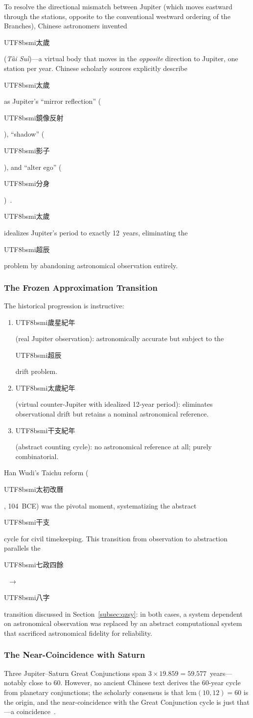 \documentclass[10pt,a4paper]{article}
\newcommand{\zh}[1]{\begin{CJK}{UTF8}{bsmi}#1\end{CJK}}
\begin{document}
To resolve the directional mismatch between Jupiter (which moves
eastward through the stations, opposite to the conventional westward
ordering of the Branches), Chinese astronomers invented \zh{太歲}
(\textit{T\`{a}i Su\`{i}})---a virtual body that moves in the
\emph{opposite} direction to Jupiter, one station per year. Chinese
scholarly sources explicitly describe \zh{太歲} as Jupiter's ``mirror
reflection'' (\zh{鏡像反射}), ``shadow'' (\zh{影子}), and ``alter ego''
(\zh{分身})~\cite{taisui_origin}. \zh{太歲} idealizes Jupiter's period
to exactly 12~years, eliminating the \zh{超辰} problem by abandoning
astronomical observation entirely.

\subsubsection{The Frozen Approximation Transition}

The historical progression is instructive:

\begin{enumerate}[nosep]
  \item \zh{歲星紀年} (real Jupiter observation): astronomically
    accurate but subject to the \zh{超辰} drift problem.
  \item \zh{太歲紀年} (virtual counter-Jupiter with idealized 12-year
    period): eliminates observational drift but retains a nominal
    astronomical reference.
  \item \zh{干支紀年} (abstract counting cycle): no astronomical
    reference at all; purely combinatorial.
\end{enumerate}

\noindent
Han Wudi's Taichu reform (\zh{太初改曆}, 104~BCE) was the pivotal
moment, systematizing the abstract \zh{干支} cycle for civil
timekeeping. This transition from observation to abstraction parallels
the \zh{七政四餘}~$\to$~\zh{八字} transition discussed in
Section~\ref{subsec:qzsy}: in both cases, a system dependent on
astronomical observation was replaced by an abstract computational
system that sacrificed astronomical fidelity for reliability.

\subsubsection{The Near-Coincidence with Saturn}

Three Jupiter--Saturn Great Conjunctions span $3 \times 19.859 =
59.577$~years---notably close to 60. However, no ancient Chinese
text derives the 60-year cycle from planetary conjunctions; the scholarly
consensus is that $\text{lcm}(10, 12) = 60$ is the origin, and the
near-coincidence with the Great Conjunction cycle is just that---a
coincidence~\cite{needham1959}.
\end{document}
